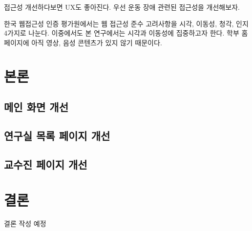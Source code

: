 \documentclass[ko]{snu-cse-bsc-thesis}
\begin{document}
접근성 개선하다보면 UX도 좋아진다. 우선 운동 장애 관련된 접근성을 개선해보자. 

한국 웹접근성 인증 평가원에서는 웹 접근성 준수 고려사항을 시각, 이동성, 청각, 인지 4가지로 나눈다. 이중에서도 본 연구에서는 시각과 이동성에 집중하고자 한다. 학부 홈페이지에 아직 영상, 음성 콘텐츠가 있지 않기 때문이다. 

\chapter{본론}\label{chap:body}

\section{메인 화면 개선}

\section{연구실 목록 페이지 개선}

\section{교수진 페이지 개선}

\chapter{결론}\label{chap:conclusion}

결론 작성 예정

\printbibliography

\begin{abstract}[en]
  영문 초록 작성 예정
\end{abstract}
\end{document}

